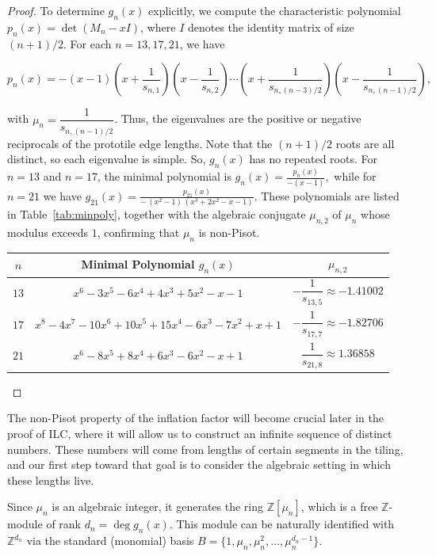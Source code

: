 \begin{proof}
To determine $g_n(x)$ explicitly, we compute the characteristic polynomial  $p_n(x) = \det(M_n - xI)$, where $I$ denotes the identity matrix of size $(n+1)/2$. For each $n =13,17,21$, we have

\begin{equation}
p_n(x)=-\left(x-1 \right) \left(x+\dfrac{1}{s_{n,1}}\right)\left(x-\dfrac{1}{s_{n,2}} \right) \cdots \left(x+\dfrac{1}{s_{n,(n-3)/2}} \right)\left(x-\dfrac{1}{s_{n,(n-1)/2}} \right),
\end{equation}

\noindent with $\mu_{n} = \dfrac{1}{s_{n,(n-1)/2}}$. Thus, the eigenvalues are the positive or negative reciprocals of the prototile edge lengths. Note that the $(n+1)/2$ roots are all distinct, so each eigenvalue is simple. So, $g_{n}(x)$ has no repeated roots. For $n = 13$ and $n = 17$, the minimal polynomial is $g_{n}(x) = \frac{p_{n}(x)}{-(x - 1)},$ while for $n = 21$ we have  $g_{21}(x) = \frac{p_{21}(x)}{-\,(x^2 - 1)\,(x^3 + 2x^2 - x - 1)}.$ These polynomials are listed in Table~\ref{tab:minpoly}, together with the algebraic conjugate $\mu_{n,2}$ of $\mu_n$ whose modulus exceeds $1$, confirming that $\mu_n$ is non-Pisot.
\newpage
\begin{center}
\renewcommand{\arraystretch}{1.5}
\label{tab:minpoly}
\begin{tabular}{| c | c | c |}
\hline
$n$ & Minimal Polynomial $g_n (x)$ &	$\mu_{n,2}$ \\
\hline
$13$ & $x^6-3x^5-6x^4+4x^3+5x^2-x-1$ & $-\dfrac{1}{s_{13,5}} \approx -1.41002$ \\ \hline
$17$ & $x^8-4x^7-10x^6+10x^5+15x^4-6x^3-7x^2+x+1$ & $-\dfrac{1}{s_{17,7}} \approx -1.82706$ \\ \hline
$21$ & $x^6-8x^5+8x^4+6x^3-6x^2-x+1$ & $\dfrac{1}{s_{21,8}} \approx 1.36858$ \\
\hline
\end{tabular}
\end{center}
\end{proof}

The non-Pisot property of the inflation factor will become crucial later in the proof of ILC, where it will allow us to construct an infinite sequence of distinct numbers. These numbers will come from lengths of certain segments in the tiling, and our first step toward that goal is to consider the algebraic setting in which these lengths live.

Since $\mu_n$ is an algebraic integer, it generates the ring $\mathbb{Z}[\mu_n]$, which is a free $\mathbb{Z}$-module of rank $d_n = \deg g_n(x)$. 
This module can be naturally identified with $\mathbb{Z}^{d_n}$ via the standard (monomial) basis $B = \{1, \mu_n, \mu_n^2, \dots, \mu_n^{d_n - 1}\}.$


